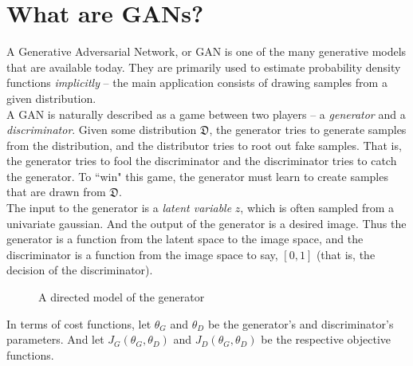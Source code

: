 \documentclass[conference]{IEEEtran}
\begin{document}
\section{What are GANs?}
A Generative Adversarial Network, or GAN is one of the many generative models that are available today. They are primarily used to estimate probability density functions \textit{implicitly} -- the main application consists of drawing samples from a given distribution. \\ 
A GAN is naturally described as a game between two players -- a \textit{generator} and a \textit{discriminator}. Given some distribution $\mathfrak{D}$, the generator tries to generate samples from the distribution, and the distributor tries to root out fake samples. That is, the generator tries to fool the discriminator and the discriminator tries to catch the generator. To ``win" this game, the generator must learn to create samples that are drawn from $\mathfrak{D}$. \\ The input to the generator is a \textit{latent variable} $z$, which is often sampled from a univariate gaussian. And the output of the generator is a desired image. Thus the generator is a function from the latent space to the image space, and the discriminator is a function from the image space to say, $[0,1]$ (that is, the decision of the discriminator).
\begin{figure}[ht] %
\centering %

\caption{A directed model of the generator}
\label{fig:my_label}
\end{figure}

In terms of cost functions, let $\theta_G$ and $\theta_D$ be the generator's and discriminator's parameters. And let $J_G(\theta_G,\theta_D)$ and $J_D(\theta_G,\theta_D)$ be the respective objective functions.
\end{document}
